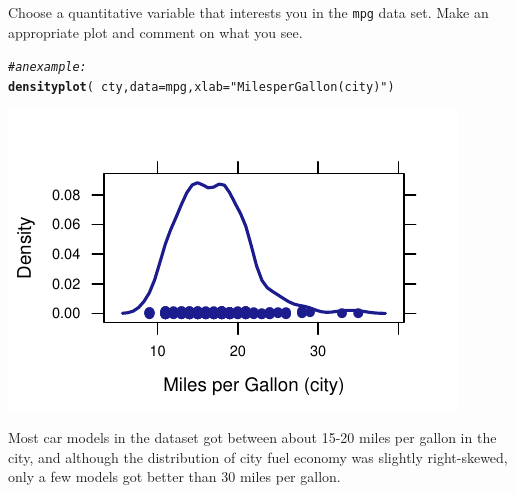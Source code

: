 \documentclass[twoside]{book}\usepackage[]{graphicx}\usepackage[]{xcolor}
\makeatletter
\def\maxwidth{ %
  \ifdim\Gin@nat@width>\linewidth
    \linewidth
  \else
    \Gin@nat@width
  \fi
}
\newcommand{\hlstr}[1]{\textcolor[rgb]{0.192,0.494,0.8}{#1}}%
\newcommand{\hlcom}[1]{\textcolor[rgb]{0.678,0.584,0.686}{\textit{#1}}}%
\newcommand{\hlopt}[1]{\textcolor[rgb]{0,0,0}{#1}}%
\newcommand{\hlstd}[1]{\textcolor[rgb]{0.345,0.345,0.345}{#1}}%
\newcommand{\hlkwc}[1]{\textcolor[rgb]{0.333,0.667,0.333}{#1}}%
\newcommand{\hlkwd}[1]{\textcolor[rgb]{0.737,0.353,0.396}{\textbf{#1}}}%
\newenvironment{kframe}{%
 \def\at@end@of@kframe{}%
 \ifinner\ifhmode%
  \def\at@end@of@kframe{\end{minipage}}%
  \begin{minipage}{\columnwidth}%
 \fi\fi%
 \def\FrameCommand##1{\hskip\@totalleftmargin \hskip-\fboxsep
 \colorbox{shadecolor}{##1}\hskip-\fboxsep
     \hskip-\linewidth \hskip-\@totalleftmargin \hskip\columnwidth}%
 \MakeFramed {\advance\hsize-\width
   \@totalleftmargin\z@ \linewidth\hsize
   \@setminipage}}%
 {\par\unskip\endMakeFramed%
 \at@end@of@kframe}
\newenvironment{knitrout}{}{} %
\newcommand{\Rindex}[1]{\index{\texttt{#1}}}
\newcommand{\dataframe}[1]{{\color{blue!80!black}\texttt{#1}}\Rindex{#1}}
\newcounter{example}[section]
\makeatother
\begin{document}
\begin{problem}
	Choose a quantitative variable that interests you in the \dataframe{mpg}
	data set.  Make an appropriate plot and comment on what you see.
\end{problem}
\begin{solution}
\begin{knitrout}
\color{fgcolor}\begin{kframe}
\begin{alltt}
\hlcom{# an example:}
\hlkwd{densityplot}\hlstd{(}\hlopt{~}\hlstd{cty,} \hlkwc{data} \hlstd{= mpg,} \hlkwc{xlab} \hlstd{=} \hlstr{"Miles per Gallon (city)"}\hlstd{)}
\end{alltt}
\end{kframe}

{\centering \includegraphics[width=\maxwidth]{figures/fig-unnamed-chunk-26-1} 

}



\end{knitrout}
Most car models in the dataset got between about 15-20 miles per gallon in the city, and although the distribution of city fuel economy was slightly right-skewed, only a few models got better than 30 miles per gallon. 
\end{solution}
\end{document}
